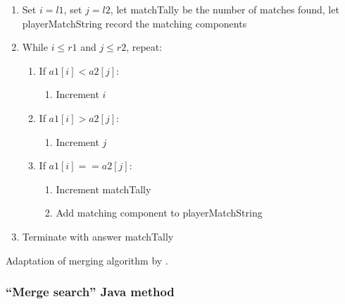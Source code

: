 \begin{enumerate}
\item Set $i = l1$, set $j = l2$, let matchTally be the number of matches found, let playerMatchString record the matching components
\item While $i \leq r1$ and $j \leq r2$, repeat:
	\begin{enumerate}
	\item If $a1[i] < a2[j]$:
		\begin{enumerate}
		\item Increment $i$
		\end{enumerate}
	\item If $a1[i] > a2[j]$:
		\begin{enumerate}
		\item Increment $j$
		\end{enumerate}
	\item If $a1[i] ==  a2[j]$:
		\begin{enumerate}
		\item Increment matchTally
		\item Add matching component to playerMatchString
		\end{enumerate}
	\end{enumerate}
\item Terminate with answer matchTally
\end{enumerate}

\noindent
Adaptation of merging algorithm by \citet[p. 46]{Watt2001}.

\subsubsection{``Merge search'' Java method}


